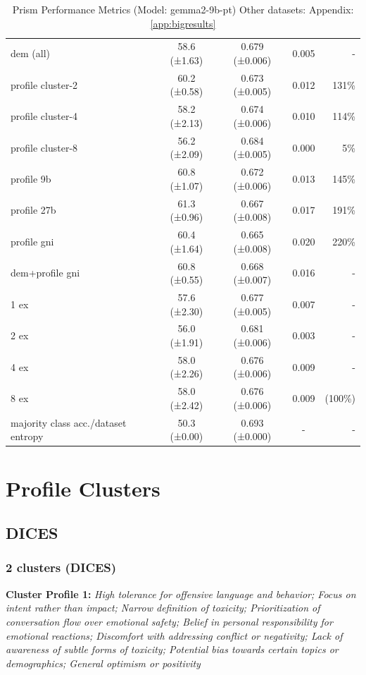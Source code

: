 \documentclass[11pt]{article}
\newcommand{\profiletext}[1]{\textit{#1}}
\begin{document}
\begin{table}[h]
\begin{tabular}{|l|c|c|c|r|}
dem (all) & 58.6 (±1.63) & 0.679 (±0.006) & 0.005 & - \\
profile cluster-2 & 60.2 (±0.58) & 0.673 (±0.005) & 0.012 & 131\% \\
profile cluster-4 & 58.2 (±2.13) & 0.674 (±0.006) & 0.010 & 114\% \\
profile cluster-8 & 56.2 (±2.09) & 0.684 (±0.005) & 0.000 & 5\% \\
profile 9b & 60.8 (±1.07) & 0.672 (±0.006) & 0.013 & 145\% \\
profile 27b & 61.3 (±0.96) & 0.667 (±0.008) & 0.017 & 191\% \\
profile gni & 60.4 (±1.64) & 0.665 (±0.008) & 0.020 & 220\% \\
dem+profile gni & 60.8 (±0.55) & 0.668 (±0.007) & 0.016 & - \\
1 ex & 57.6 (±2.30) & 0.677 (±0.005) & 0.007 & - \\
2 ex & 56.0 (±1.91) & 0.681 (±0.006) & 0.003 & - \\
4 ex & 58.0 (±2.26) & 0.676 (±0.006) & 0.009 & - \\
8 ex & 58.0 (±2.42) & 0.676 (±0.006) & 0.009 & (100\%) \\
majority class acc./dataset entropy & 50.3 (±0.00) & 0.693 (±0.000) & - & - \\
\hline
\end{tabular}
\caption{Prism Performance Metrics (Model: gemma2-9b-pt) Other datasets: Appendix: \ref{app:bigresults}}
\label{tab:performance_prism}
\end{table}


\newpage
\section{Profile Clusters}

\label{app:profileclusters}


\subsection{DICES}

\subsubsection{2 clusters (DICES)}

\textbf{Cluster Profile 1:} \profiletext{High tolerance for offensive language and behavior; Focus on intent rather than impact; Narrow definition of toxicity; Prioritization of conversation flow over emotional safety; Belief in personal responsibility for emotional reactions; Discomfort with addressing conflict or negativity; Lack of awareness of subtle forms of toxicity; Potential bias towards certain topics or demographics; General optimism or positivity}
\end{document}
